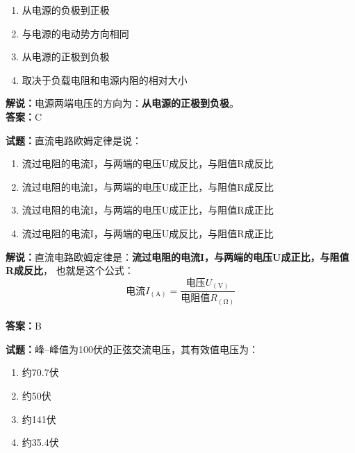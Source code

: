 \documentclass{ctexbook}
\begin{document}
\begin{enumerate}[leftmargin=3em]
  \item 从电源的负极到正极
  \item 与电源的电动势方向相同
  \item 从电源的正极到负极
  \item 取决于负载电阻和电源内阻的相对大小
\end{enumerate}

\noindent\textbf{解说：}电源两端电压的方向为：\textbf{从电源的正极到负极}。\\\noindent\textbf{答案：}C

\vspace{\baselineskip}

\noindent\textbf{试题：}直流电路欧姆定律是说：

\begin{enumerate}[leftmargin=3em]
  \item 流过电阻的电流I，与两端的电压U成反比，与阻值R成反比
  \item 流过电阻的电流I，与两端的电压U成正比，与阻值R成反比
  \item 流过电阻的电流I，与两端的电压U成正比，与阻值R成正比
  \item 流过电阻的电流I，与两端的电压U成反比，与阻值R成正比
\end{enumerate}

\noindent\textbf{解说：}直流电路欧姆定律是：\textbf{流过电阻的电流I，与两端的电压U成正比，与阻值R成反比}，
也就是这个公式：
\[\mbox{电流}I_{(\unit{\ampere})} = \frac{\mbox{电压}U_{(\unit{\volt})}}{\mbox{电阻值}R_{(\unit{\ohm})}}\]
\\\noindent\textbf{答案：}B

\vspace{\baselineskip}

\noindent\textbf{试题：}峰--峰值为100伏的正弦交流电压，其有效值电压为：
\begin{enumerate}[leftmargin=3em]
  \item 约70.7伏
  \item 约50伏
  \item 约141伏
  \item 约35.4伏
\end{enumerate}
\end{document}
